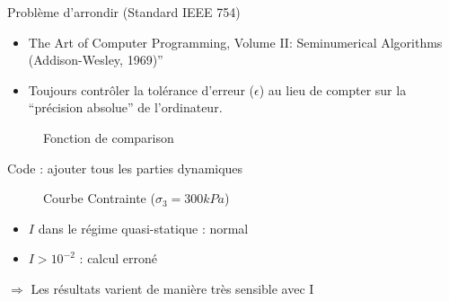 \documentclass[10pt]{beamer}
\begin{document}
\begin{frame}{Problème d'arrondir (Standard IEEE 754)}
    \begin{itemize}
        \item The Art of Computer Programming, Volume II: Seminumerical Algorithms (Addison-Wesley, 1969)”
        \item Toujours contrôler la tolérance d’erreur ($\epsilon$) au lieu de compter sur la “précision absolue” de l’ordinateur.
    \end{itemize}
    \begin{figure}[h]
        \centering
        \caption{Fonction de comparison}
    \end{figure}
\end{frame}

\begin{frame}{Code : ajouter tous les parties dynamiques}
    \begin{figure}[h]
        \centering
        \scalebox{0.5}{}
        \caption{Courbe Contrainte ($\sigma_3 = 300kPa$)}
    \end{figure}
    \begin{itemize}
        \item $I$ dans le régime quasi-statique : normal
        \item $I > 10^{-2}$ : calcul erroné
    \end{itemize}
    $\Rightarrow$ Les résultats varient de manière très sensible avec I
\end{frame}
\end{document}
